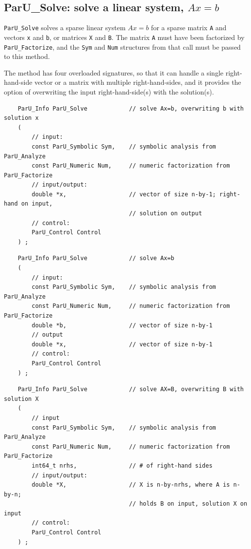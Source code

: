 \documentclass[12pt]{article}
\begin{document}
\subsection{{\sf ParU\_Solve}: solve a linear system, $Ax=b$}

    \verb'ParU_Solve' solves a sparse linear system $Ax=b$ for a sparse
    matrix \verb'A' and vectors \verb'x' and \verb'b', or matrices
    \verb'X' and \verb'B'.  The matrix \verb'A' must have been factorized
    by \verb'ParU_Factorize', and the \verb'Sym' and \verb'Num' structures
    from that call must be passed to this method.

    The method has four overloaded signatures, so that it can handle a single
    right-hand-side vector or a matrix with multiple right-hand-sides, and it
    provides the option of overwriting the input right-hand-side(s) with the
    solution(s).

    {\footnotesize
    \begin{verbatim}
    ParU_Info ParU_Solve            // solve Ax=b, overwriting b with solution x
    (
        // input:
        const ParU_Symbolic Sym,    // symbolic analysis from ParU_Analyze
        const ParU_Numeric Num,     // numeric factorization from ParU_Factorize
        // input/output:
        double *x,                  // vector of size n-by-1; right-hand on input,
                                    // solution on output
        // control:
        ParU_Control Control
    ) ; \end{verbatim} }

    {\footnotesize
    \begin{verbatim}
    ParU_Info ParU_Solve            // solve Ax=b
    (
        // input:
        const ParU_Symbolic Sym,    // symbolic analysis from ParU_Analyze
        const ParU_Numeric Num,     // numeric factorization from ParU_Factorize
        double *b,                  // vector of size n-by-1
        // output
        double *x,                  // vector of size n-by-1
        // control:
        ParU_Control Control
    ) ; \end{verbatim} }

    {\footnotesize
    \begin{verbatim}
    ParU_Info ParU_Solve            // solve AX=B, overwriting B with solution X
    (
        // input
        const ParU_Symbolic Sym,    // symbolic analysis from ParU_Analyze
        const ParU_Numeric Num,     // numeric factorization from ParU_Factorize
        int64_t nrhs,               // # of right-hand sides
        // input/output:
        double *X,                  // X is n-by-nrhs, where A is n-by-n;
                                    // holds B on input, solution X on input
        // control:
        ParU_Control Control
    ) ; \end{verbatim} }
\end{document}

